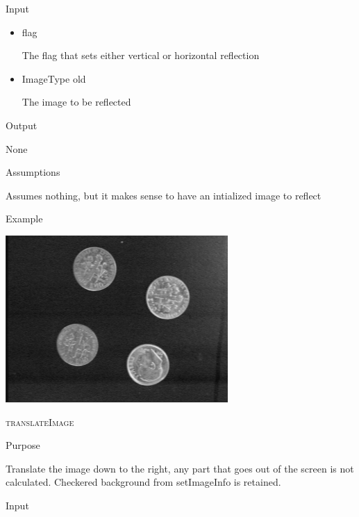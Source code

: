 \documentclass[pdftex, 11pt]{article}
\begin{document}
\begin{description}
\begin{description}
			\item{Input}

				\begin{itemize}

					\item{flag}

						The flag that sets either vertical or
						horizontal reflection

					\item{ImageType old}

						The image to be reflected

				\end{itemize}

			\item{Output}

				None

			\item{Assumptions}

				Assumes nothing, but it makes sense to have an intialized
				image to reflect

			\item{Example}

				\includegraphics{images/outreflect.png}

		\end{description}


	\item{\textsc{translateImage}}
		\begin{description}
			\item{Purpose}

				Translate the image down to the right,
				any part that goes out of the screen is
 				not calculated.  Checkered background from
				setImageInfo is retained.

			\item{Input}

				\begin{itemize}


\end{itemize}
\end{description}
\end{description}
\end{document}
